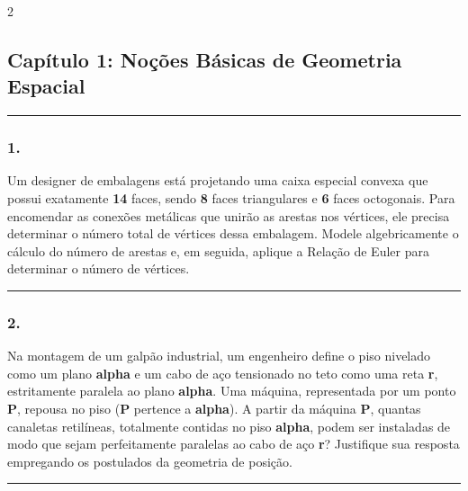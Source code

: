 \documentclass[twoside, 10pt, a4paper]{article}
\newlength{\espacoPosTitulo}\setlength{\espacoPosTitulo}{0.3cm}
\newlength{\espacoPreQuestao}\setlength{\espacoPreQuestao}{0.1cm}
\newlength{\espacoQuestao}\setlength{\espacoQuestao}{0.2cm}
\begin{document}
\par\vspace{0.3cm} 
\raggedcolumns
\begin{multicols*}{2}
\vspace{0.1cm}

\subsection*{Capítulo 1: Noções Básicas de Geometria Espacial}
\vspace{-0.2cm}\noindent\rule{\linewidth}{1.5pt} 
\par\vspace{\espacoPosTitulo}
\subsubsection*{1.} Um designer de embalagens está projetando uma caixa especial convexa que possui exatamente \textbf{14} faces, sendo \textbf{8} faces triangulares e \textbf{6} faces octogonais. Para encomendar as conexões metálicas que unirão as arestas nos vértices, ele precisa determinar o número total de vértices dessa embalagem. Modele algebricamente o cálculo do número de arestas e, em seguida, aplique a Relação de Euler para determinar o número de vértices.
\par\vspace{\espacoQuestao}

\noindent\textcolor{CorLinha}{\rule{\linewidth}{0.5pt}} 
\par\vspace{\espacoPreQuestao}
\subsubsection*{2.} Na montagem de um galpão industrial, um engenheiro define o piso nivelado como um plano \textbf{alpha} e um cabo de aço tensionado no teto como uma reta \textbf{r}, estritamente paralela ao plano \textbf{alpha}. Uma máquina, representada por um ponto \textbf{P}, repousa no piso (\textbf{P} pertence a \textbf{alpha}). A partir da máquina \textbf{P}, quantas canaletas retilíneas, totalmente contidas no piso \textbf{alpha}, podem ser instaladas de modo que sejam perfeitamente paralelas ao cabo de aço \textbf{r}? Justifique sua resposta empregando os postulados da geometria de posição.
\par\vspace{\espacoQuestao}

\noindent\textcolor{CorLinha}{\rule{\linewidth}{0.5pt}}
\par\vspace{\espacoPreQuestao}

\end{multicols*}
\end{document}
